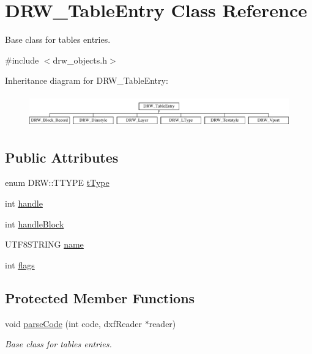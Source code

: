 \hypertarget{class_d_r_w___table_entry}{}\section{D\+R\+W\+\_\+\+Table\+Entry Class Reference}
\label{class_d_r_w___table_entry}


Base class for tables entries.  




{\ttfamily \#include $<$drw\+\_\+objects.\+h$>$}

Inheritance diagram for D\+R\+W\+\_\+\+Table\+Entry\+:\begin{figure}[H]
\begin{center}
\leavevmode
\includegraphics[height=1.393035cm]{de/d86/class_d_r_w___table_entry}
\end{center}
\end{figure}
\subsection*{Public Attributes}
\begin{DoxyCompactItemize}
\item 
enum D\+R\+W\+::\+T\+T\+Y\+P\+E \hyperlink{class_d_r_w___table_entry_a4ceb84db2231dcc1c3070e5825966a0d}{t\+Type}
\item 
int \hyperlink{class_d_r_w___table_entry_a9aefd859bd8a3d423f53623f8f089ac3}{handle}
\item 
int \hyperlink{class_d_r_w___table_entry_a91713970d0eec5baf8aa16b8c5556ce7}{handle\+Block}
\item 
U\+T\+F8\+S\+T\+R\+I\+N\+G \hyperlink{class_d_r_w___table_entry_a854ab48893457e607ac13425304415b4}{name}
\item 
int \hyperlink{class_d_r_w___table_entry_a45931e761e264e52857687067029e6a8}{flags}
\end{DoxyCompactItemize}
\subsection*{Protected Member Functions}
\begin{DoxyCompactItemize}
\item 
void \hyperlink{class_d_r_w___table_entry_ae342918d8e3005bd640762de9d52dbde}{parse\+Code} (int code, dxf\+Reader $\ast$reader)
\begin{DoxyCompactList}\small\item\em Base class for tables entries. \end{DoxyCompactList}\end{DoxyCompactItemize}


